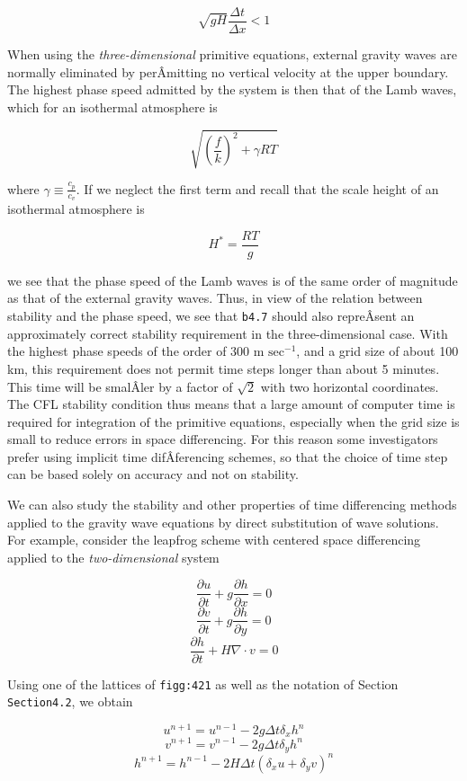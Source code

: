 {\[\sqrt{gH}\frac{\Delta t}{\Delta x} < 1\]}

When using the \emph{three-dimensional} primitive equations, external
gravity waves are normally eliminated by perÂ­mitting no vertical
velocity at the upper boundary. The highest phase speed admitted by the
system is then that of the Lamb waves, which for an isothermal
atmosphere is

\[\sqrt{\left( \frac{f}{k} \right)^{2} + \gamma RT}\]

where \(\gamma \equiv \frac{c_{p}}{c_{v}}\). If we neglect the first
term and recall that the scale height of an isothermal atmosphere is

\[H^{*} = \frac{RT}{g}\]

we see that the phase speed of the Lamb waves is of the same order of
magnitude as that of the external gravity waves. Thus, in view of the
relation between stability and the phase speed, we see that
\texttt{b4.7} should also repreÂ­sent an approximately correct stability
requirement in the three-dimensional case. With the highest phase speeds
of the order of 300 m \(\text{sec}^{-1}\), and a grid size of about 100
km, this requirement does not permit time steps longer than about 5
minutes. This time will be smalÂ­ler by a factor of \(\sqrt{2}\) with two
horizontal coordinates. The CFL stability condition thus means that a
large amount of computer time is required for integration of the
primitive equations, especially when the grid size is small to reduce
errors in space differencing. For this reason some investigators prefer
using implicit time difÂ­ferencing schemes, so that the choice of time
step can be based solely on accuracy and not on stability.

We can also study the stability and other properties of time
differencing methods applied to the gravity wave equations by direct
substitution of wave solutions. For example, consider the leapfrog
scheme with centered space differencing applied to the
\emph{two-dimensional} system

{\[\frac{\partial u}{\partial t} + g\frac{\partial h}{\partial x} = 0\]\[\frac{\partial v}{\partial t} + g\frac{\partial h}{\partial y} = 0\]\[\frac{\partial h}{\partial t} + H\nabla\cdot v = 0\]}

Using one of the lattices of \texttt{figg:421} as well as the notation
of Section \texttt{Section4.2}, we obtain

{\[u^{n+1} = u^{n-1} -2 g \Delta t \delta_x h^n\]\[v^{n+1} = v^{n-1} -2 g \Delta t \delta_y h^n\]\[h^{n+1} = h^{n-1} -2 H \Delta t ( \delta_x u + \delta_y v)^n\]}

